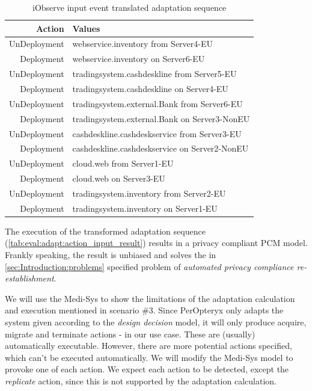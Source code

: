 \begin{table}[h]
	\centering
	\begin{tabular}{r | l}
		\hline
		\textbf{Action} & \textbf{Values}\\
		\hline
		UnDeployment & webservice.inventory from Server4-EU\\
		Deployment & webservice.inventory on Server6-EU\\
		
		UnDeployment & tradingsystem.cashdeskline from Server5-EU\\
		Deployment & tradingsystem.cashdeskline on Server4-EU\\
		
		UnDeployment & tradingsystem.external.Bank from Server6-EU\\
		Deployment & tradingsystem.external.Bank on Server3-NonEU\\
		
		UnDeployment & cashdeskline.cashdeskservice from Server3-EU\\
		Deployment & cashdeskline.cashdeskservice on Server2-NonEU\\
		
		UnDeployment & cloud.web from Server1-EU\\
		Deployment & cloud.web on Server3-EU\\
		
		UnDeployment & tradingsystem.inventory from Server2-EU\\
		Deployment & tradingsystem.inventory on Server1-EU\\
		\hline
	\end{tabular}
	\caption{iObserve input event translated adaptation sequence}
	\label{tab:eval:adapt:action_input_result}
\end{table}


The execution of the transformed adaptation sequence (\autoref{tab:eval:adapt:action_input_result}) results in a privacy compliant PCM model. Frankly speaking, the result is unbiased and solves the in \autoref{sec:Introduction:problems} specified problem of \textit{automated privacy compliance re-establishment}.

We will use the Medi-Sys to show the limitations of the adaptation calculation and execution mentioned in scenario \#3. Since PerOpteryx only adapts the system given according to the \textit{design decision} model, it will only produce acquire, migrate and terminate actions - in our use case. These are (usually) automatically executable. However, there are more potential actions specified, which can't be executed automatically. We will modify the Medi-Sys model to provoke one of each action. We expect each action to be detected, except the \textit{replicate} action, since this is not supported by the adaptation calculation.



